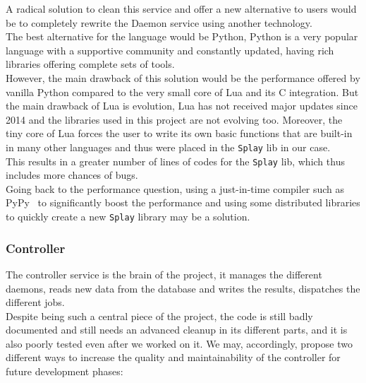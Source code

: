 \documentclass{eplmastersthesis}
\begin{document}
          A radical solution to clean this service and offer a new alternative
          to users would be to completely rewrite the Daemon service using
          another technology.\\
          The best alternative for the language would be Python, Python is a
          very popular language with a supportive community and constantly
          updated, having rich libraries offering complete sets of tools.\\
          However, the main drawback of this solution would be the performance
          offered by vanilla Python compared to the very small core of Lua and
          its C integration. But the main drawback of Lua is evolution, Lua has
          not received major updates since 2014 and the libraries used in this
          project are not evolving too. Moreover, the tiny core of Lua forces
          the user to write its own basic functions that are built-in in many
          other languages and thus were placed in the \texttt{Splay} lib in our case.\\
          This results in a greater number of lines of codes for the \texttt{Splay} lib,
          which thus includes more chances of bugs.\\
          Going back to the performance question, using a just-in-time compiler
          such as PyPy~\cite{PyPy} to significantly boost the performance and
          using some distributed libraries to quickly create a new \texttt{Splay} library
          may be a solution.

        \subsubsection{Controller}

          The controller service is the brain of the project, it manages the
          different daemons, reads new data from the database and writes the
          results, dispatches the different jobs.\\
          Despite being such a central piece of the project, the code is still
          badly documented and still needs an advanced cleanup in its
          different parts, and it is also poorly tested even after we worked
          on it. We may, accordingly, propose two different ways to increase
          the quality and maintainability of the controller for future
          development phases:
\end{document}

